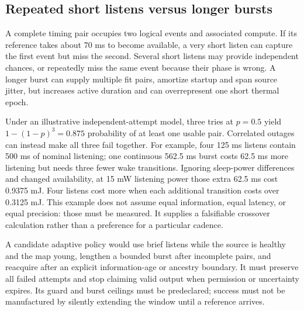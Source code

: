 \documentclass[11pt,letterpaper]{article}
\begin{document}
\subsection{Repeated short listens versus longer bursts}
A complete timing pair occupies two logical events and associated compute. If its reference takes about 70 ms to become available, a very short listen can capture the first event but miss the second. Several short listens may provide independent chances, or repeatedly miss the same event because their phase is wrong. A longer burst can supply multiple fit pairs, amortize startup and span source jitter, but increases active duration and can overrepresent one short thermal epoch.

Under an illustrative independent-attempt model, three tries at $p=0.5$ yield $1-(1-p)^3=0.875$ probability of at least one usable pair. Correlated outages can instead make all three fail together. For example, four 125 ms listens contain 500 ms of nominal listening; one continuous 562.5 ms burst costs 62.5 ms more listening but needs three fewer wake transitions. Ignoring sleep-power differences and changed availability, at 15 mW listening power those extra 62.5 ms cost 0.9375 mJ. Four listens cost more when each additional transition costs over 0.3125 mJ. This example does not assume equal information, equal latency, or equal precision: those must be measured. It supplies a falsifiable crossover calculation rather than a preference for a particular cadence.

A candidate adaptive policy would use brief listens while the source is healthy and the map young, lengthen a bounded burst after incomplete pairs, and reacquire after an explicit information-age or ancestry boundary. It must preserve all failed attempts and stop claiming valid output when permission or uncertainty expires. Its guard and burst ceilings must be predeclared; success must not be manufactured by silently extending the window until a reference arrives.
\end{document}
